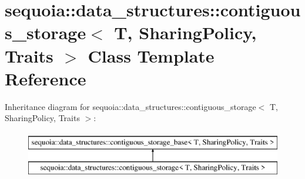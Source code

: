 \hypertarget{classsequoia_1_1data__structures_1_1contiguous__storage}{}\section{sequoia\+::data\+\_\+structures\+::contiguous\+\_\+storage$<$ T, Sharing\+Policy, Traits $>$ Class Template Reference}
\label{classsequoia_1_1data__structures_1_1contiguous__storage}
Inheritance diagram for sequoia\+::data\+\_\+structures\+::contiguous\+\_\+storage$<$ T, Sharing\+Policy, Traits $>$\+:\begin{figure}[H]
\begin{center}
\leavevmode
\includegraphics[height=2.000000cm]{classsequoia_1_1data__structures_1_1contiguous__storage}
\end{center}
\end{figure}
